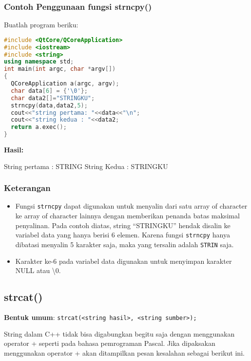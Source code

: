 \subsubsection*{Contoh  Penggunaan fungsi strncpy()}

Buatlah program beriku:

\begin{lstlisting}[language=c++, caption=Penggunaan fungsi strncpy(), label=contoh3-22]
#include <QtCore/QCoreApplication>
#include <iostream>
#include <string>
using namespace std;
int main(int argc, char *argv[])
{
  QCoreApplication a(argc, argv);
  char data[6] = {'\0'};
  char data2[]="STRINGKU";
  strncpy(data,data2,5);
  cout<<"string pertama: "<<data<<"\n";
  cout<<"string kedua : "<<data2;
  return a.exec();
}
\end{lstlisting}

\textbf{Hasil:}
\begin{lcverbatim}
 String pertama : STRING
 String Kedua : STRINGKU
\end{lcverbatim}


\subsubsection*{Keterangan}

\begin{itemize}

\item
  Fungsi \texttt{strncpy} dapat digunakan untuk menyalin dari satu array
  of character ke array of character lainnya dengan memberikan penanda
  batas maksimal penyalinan. Pada contoh diatas, string ``STRINGKU''
  hendak disalin ke variabel data yang hanya berisi 6 elemen. Karena
  fungsi \texttt{strncpy} hanya dibatasi menyalin 5 karakter saja, maka
  yang tersalin adalah \texttt{STRIN} saja.
\item
  Karakter ke-6 pada variabel data digunakan untuk menyimpan karakter
 NULL atau \textbackslash0.
\end{itemize}

\subsection{strcat()}\label{strcat}

\textbf{Bentuk umum}:
\texttt{strcat(\textless{}string\ hasil\textgreater{},\ \textless{}string\ sumber\textgreater{});}

String dalam C++ tidak bisa digabungkan begitu saja dengan menggunakan
operator + seperti pada bahasa pemrograman Pascal. Jika dipaksakan
menggunakan operator + akan ditampilkan pesan kesalahan sebagai berikut
ini.

